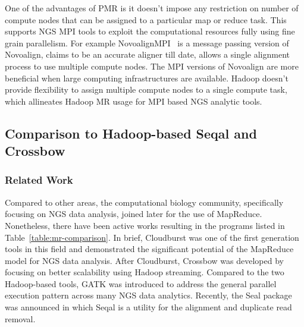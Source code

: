 \documentclass{acm_proc_article-sp}
\begin{document}
One of the advantages of PMR is it doesn't impose any restriction on
number of compute nodes that can be assigned to a particular map or
reduce task. This supports NGS MPI tools to exploit the computational
resources fully using fine grain parallelism. For example
NovoalignMPI~\cite{novo-align} is a message passing version of
Novoalign, claims to be an accurate aligner till date, allows a single
alignment process to use multiple compute nodes. The MPI versions of
Novoalign are more beneficial when large computing infrastructures are
available. Hadoop doesn't provide flexibility to assign multiple
compute nodes to a single compute task, which allineates Hadoop MR
usage for MPI based NGS analytic tools.

\subsection{Comparison to Hadoop-based Seqal and Crossbow}

\subsubsection{Related Work}
Compared to other areas, the computational biology community,
specifically focusing on NGS data analysis, joined later for the use
of MapReduce\cite{cloudburst}.  Nonetheless, there have been active
works resulting in the programs listed in
Table~\ref{table:mr-comparison}.  In brief, Cloudburst was one of the
first generation tools in this field and demonstrated the significant
potential of the MapReduce model for NGS data analysis.  After
Cloudburst, Crossbow was developed by focusing on better scalability
using Hadoop streaming.  Compared to the two Hadoop-based tools, GATK
was introduced to address the general parallel execution pattern
across many NGS data analytics.  Recently, the Seal package was
announced in which Seqal is a utility for the alignment and duplicate
read removal.
\end{document}
